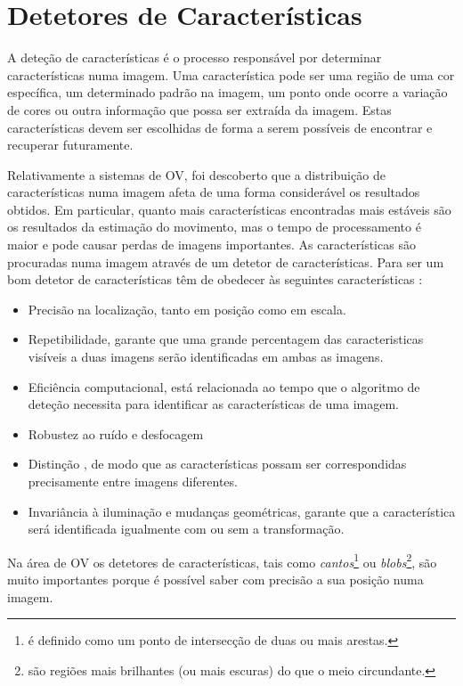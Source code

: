 \section{Detetores de Características}\label{detCar}

A deteção de características é o processo responsável por determinar características numa imagem. Uma característica pode ser uma região de uma cor específica, um determinado padrão na imagem, um ponto onde ocorre a variação de cores ou outra informação que possa ser extraída da imagem. Estas características devem ser escolhidas de forma a serem possíveis de encontrar e recuperar futuramente. 

Relativamente a sistemas de OV, foi descoberto que a distribuição de características numa imagem afeta de uma forma considerável os resultados obtidos. Em particular, quanto mais características encontradas mais estáveis são os resultados da estimação do movimento, mas o tempo de processamento é maior e pode causar perdas de imagens importantes. As características são procuradas numa imagem através de um detetor de características. Para ser um bom detetor de características têm de obedecer às seguintes características \cite{Fraundorfer2012}:
\begin{itemize}
	\item Precisão na localização, tanto em posição como em escala.
	\item Repetibilidade, garante que uma grande percentagem das caracteristicas visíveis a duas imagens serão identificadas em ambas as imagens.
	\item Eficiência computacional, está relacionada ao tempo que o algoritmo de deteção necessita para identificar as características de uma imagem.
	\item Robustez ao ruído e desfocagem
	\item Distinção , de modo que as características possam ser correspondidas precisamente entre imagens diferentes.
	\item Invariância à iluminação e mudanças geométricas, garante que a característica será identificada igualmente com ou sem a transformação.
\end{itemize}

Na área de OV os detetores de características, tais como \textit{cantos}\footnote{é definido como um ponto de intersecção de duas ou mais arestas.} ou \textit{blobs}\footnote{são regiões mais brilhantes (ou mais escuras) do que o meio circundante.}, são muito importantes porque é possível saber com precisão a sua posição numa imagem. 

